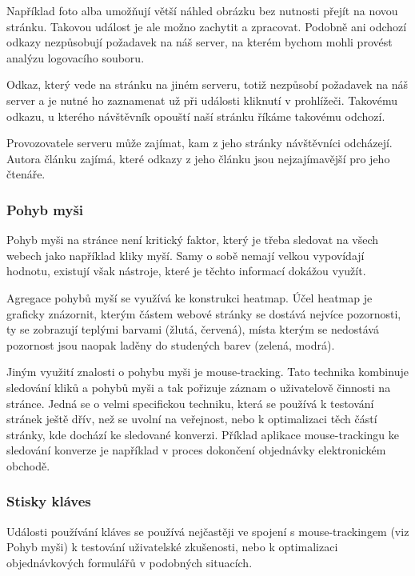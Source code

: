 \documentclass[bc,male,java,dept456]{diploma}						%
\begin{document}
Například foto alba umožňují větší náhled obrázku bez nutnosti přejít na novou stránku. Takovou událost je ale možno zachytit a zpracovat. Podobně ani odchozí odkazy nezpůsobují požadavek na náš server, na kterém bychom mohli provést analýzu logovacího souboru. 

Odkaz, který vede na stránku na jiném serveru, totiž nezpůsobí požadavek na náš server a je nutné ho zaznamenat už při události kliknutí v prohlížeči. Takovému odkazu, u kterého návštěvník opouští naší stránku říkáme takovému odchozí. 

Provozovatele serveru může zajímat, kam z jeho stránky návštěvníci odcházejí. Autora článku zajímá, které odkazy z jeho článku jsou nejzajímavější pro jeho čtenáře.


\subsubsection{Pohyb myši}

Pohyb myši na stránce není kritický faktor, který je třeba sledovat na všech webech jako například kliky myší. Samy o sobě nemají velkou vypovídají hodnotu, existují však nástroje, které je těchto informací dokážou využít.

Agregace pohybů myší se využívá ke konstrukci heatmap. Účel heatmap je graficky znázornit, kterým částem webové stránky se dostává nejvíce pozornosti, ty se zobrazují teplými barvami (žlutá, červená), místa kterým se nedostává pozornost jsou naopak la\-dě\-ny do studených barev (zelená, modrá).

Jiným využití znalosti o pohybu myši je mouse-tracking. Tato technika kombinuje sledování kliků a pohybů myši a tak pořizuje záznam o uživatelově činnosti na stránce. Jedná se o velmi specifickou techniku, která se používá k testování stránek ještě dřív, než se uvolní na veřejnost, nebo k optimalizaci těch částí stránky, kde dochází ke sledované konverzi. Příklad aplikace mouse-trackingu ke sledování konverze je například v proces dokončení objednávky elektronickém obchodě.



\subsubsection{Stisky kláves}

Události používání kláves se používá nejčastěji ve spojení s mouse-trackingem (viz Pohyb myši) k testování uživatelské zkušenosti, nebo k optimalizaci objednávkových formulářů v podobných situacích.
\end{document}
